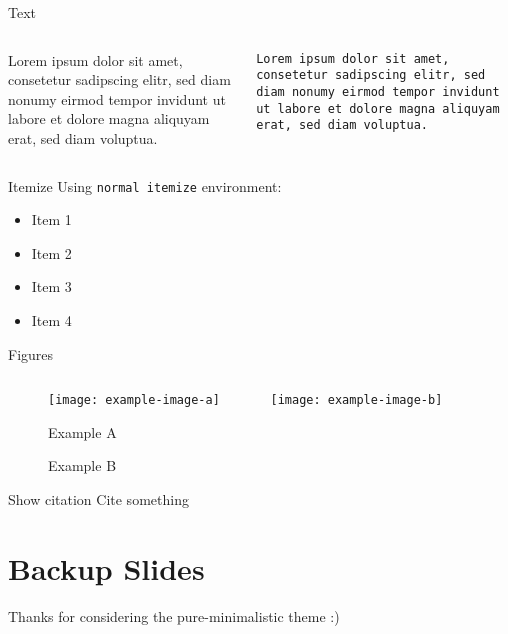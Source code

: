 \maketitle

\begin{frame}{Text}
    \begin{columns}[T]
        \begin{column}{.48\linewidth}
            Lorem ipsum dolor sit amet, consetetur sadipscing elitr, 
            sed diam nonumy eirmod tempor invidunt ut labore et dolore 
            magna aliquyam erat, sed diam voluptua.
        \end{column}
        \begin{column}{.48\linewidth}
            \texttt{Lorem ipsum dolor sit amet, 
            consetetur sadipscing elitr, 
            sed diam nonumy eirmod tempor invidunt ut labore et dolore 
            magna aliquyam erat, sed diam voluptua.}
        \end{column}
    \end{columns}
\end{frame}

\begin{frame}{Itemize}
    Using \texttt{normal itemize} environment:
    \begin{itemize}
        \item Item 1
        \item Item 2
        \item Item 3
        \item Item 4
    \end{itemize} 
\end{frame}

\begin{frame}{Figures}
    \begin{figure}[H]
        \centering
        \begin{columns}[T]
            \begin{column}{.4\linewidth}
                \texttt{[image: example-image-a]}
                \caption{Example A}
            \end{column}
            \begin{column}{.4\linewidth}
                \texttt{[image: example-image-b]}
                \caption{Example B}
            \end{column}
        \end{columns}
    \end{figure}
\end{frame}

\begin{frame}{Show citation}
    Cite something \cite{AlexNet}
    \vfill
    \printbibliography
\end{frame}

\section*{Backup Slides}
\begin{frame}
  \centering
  \vfill
  {\fontsize{30}{40}\selectfont Thanks for considering the pure-minimalistic theme :)}
  \vfill
\end{frame}

